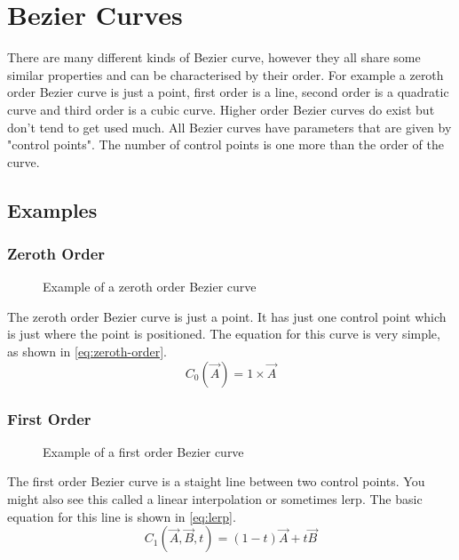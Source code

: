\documentclass[a5paper,12pt]{book}
\begin{document}

\clearpage
\tableofcontents
\listoftables
\listoffigures
\clearpage

\chapter{Bezier Curves}
There are many different kinds of Bezier curve, however they all share some similar properties and can be characterised by their order.
For example a zeroth order Bezier curve is just a point, first order is a line, second order is a quadratic curve and third order is a cubic curve.
Higher order Bezier curves do exist but don't tend to get used much. All Bezier curves have parameters that are given by "control points". The number of control points is one more than the order of the curve.
\section{Examples}
\subsection{Zeroth Order}
\begin{figure}[h]
    \centering
    
    \caption{Example of a zeroth order Bezier curve} \label{fig:example-zeroth}
\end{figure}
The zeroth order Bezier curve is just a point. It has just one control point which is just where the point is positioned. The equation for this curve is very simple, as shown in \ref{eq:zeroth-order}.
\begin{equation} \label{eq:zeroth-order}
    C_{0}(\vec{A})=1\times\vec{A}
\end{equation}
\subsection{First Order}
\begin{figure}[h]
    \centering
    
    \caption{Example of a first order Bezier curve} \label{fig:example-first}
\end{figure}
The first order Bezier curve is a staight line between two control points. You might also see this called a linear interpolation or sometimes lerp. The basic equation for this line is shown in \ref{eq:lerp}.
\begin{equation} \label{eq:lerp}
    C_{1}(\vec{A},\vec{B},t)=(1-t)\vec{A}+t\vec{B}
\end{equation}
\end{document}
